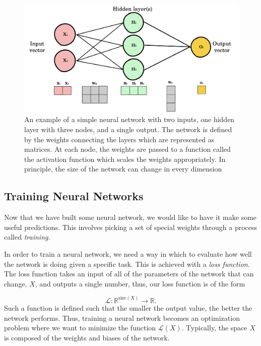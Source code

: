 \documentclass{CUP-JNL-DTM}%
\theoremstyle{definition}
\numberwithin{equation}{section}
\newcommand{\loss}{\mathcal{L}}
\newcommand{\Define}{\emph}
\begin{document}
\begin{figure}
\centering
\includegraphics[width=0.7\linewidth]{figures/NN_example.png}
\caption{An example of a simple neural network with two inputs, one hidden layer with three nodes, and a single output. The network is defined by the weights connecting the layers which are represented as matrices. At each node, the weights are passed to a function called the activation function which scales the weights appropriately. In principle, the size of the network can change in every dimension}
\label{fig:NNexample}
\end{figure}



\subsection{Training Neural Networks}

Now that we have built some neural network, we would like to have it make some useful predictions. This involves picking a set of special weights through a process called \Define{training}. 

In order to train a neural network, we need a way in which to evaluate how well the network is doing given a specific task. This is achieved with a \emph{loss function}. The loss function takes an input of all of the parameters of the network that can change, $X$, and outputs a single number, thus, our loss function is of the form

\begin{equation}
    \loss : \mathbb{R}^{\textrm{size}(X)} \rightarrow \mathbb{R}. 
\end{equation}
Such a function is defined such that the smaller the output value, the better the network performs. Thus, training a neural network becomes an optimization problem where we want to minimize the function $\loss(X)$. Typically, the space $X$ is composed of the weights and biases of the network. 
\end{document}
